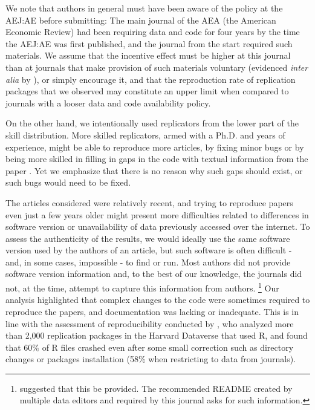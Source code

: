 \documentclass{cje} %
\theoremstyle{plain}%
\theoremstyle{definition}
\theoremstyle{remark}
\begin{document}
We note that authors in general must have been aware of the policy at the AEJ:AE before submitting: The main journal of the AEA (the American Economic Review) had been requiring data and code for four years by the time the \ac{AEJ:AE} was first published, and the journal from the start required such materials. We  assume that the incentive effect must be higher at this journal than at journals that make provision of such materials voluntary (evidenced \textit{inter alia} by \cite{greiner2023}), or simply encourage it, and that the reproduction rate of replication packages that we observed may constitute an upper limit when compared to journals with a looser data and code availability policy.

On the other hand, we intentionally used replicators from the lower part of the skill distribution. More skilled replicators, armed with a Ph.D. and years of experience, might be able to reproduce more articles, by fixing minor bugs or by being more skilled in filling in gaps in the code with textual information from the paper \citep[see ][]{greiner2023}. Yet we emphasize that there is no reason why such gaps should exist, or such bugs would need to be fixed. 

The articles considered were relatively recent, and trying to reproduce papers even just a few years older might present more difficulties related to differences in software version or unavailability of data previously accessed over the internet. To assess the authenticity of the results, we would ideally use the same software version used by the authors of an article, but such software is often difficult - and, in some cases, impossible - to find or run. Most authors did not provide software version information and, to the best of our knowledge, the journals did not, at the time, attempt to capture this information from authors.%
\footnote{\cite{McCullough2006} suggested that this be provided. The recommended README created by multiple data editors \citep{templateREADMEv1.0,templateREADMEv1.1} and required by this journal asks for such information.}
Our analysis highlighted that complex changes to the code were sometimes required to reproduce the papers, and documentation was lacking or inadequate. This is in line with the assessment of reproducibility conducted by \cite{trisovic2021}, who analyzed more than 2,000 replication packages in the Harvard Dataverse that used R, and found that 60$\%$ of R files crashed even after some small correction such as directory changes or packages installation (58$\%$ when restricting to data from journals). 
%
%
\end{document}
